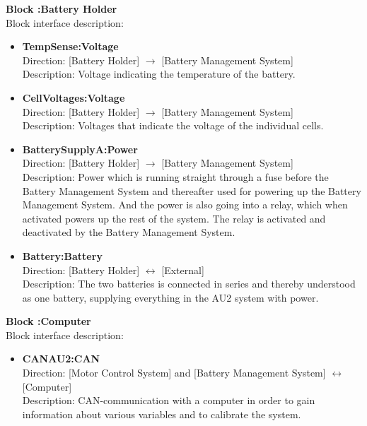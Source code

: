 \textbf{Block :Battery Holder}\\
Block interface description:
\begin{itemize}
	\item \textbf{TempSense:Voltage}\\
	Direction: [Battery Holder] $\rightarrow$ [Battery Management System]\\
	Description: Voltage indicating the temperature of the battery.
	\item \textbf{CellVoltages:Voltage}\\
	Direction: [Battery Holder] $\rightarrow$ [Battery Management System]\\
	Description: Voltages that indicate the voltage of the individual cells.
	\item \textbf{BatterySupplyA:Power}\\
	Direction: [Battery Holder] $\rightarrow$ [Battery Management System]\\
	Description: Power which is running straight through a fuse before the Battery Management System and thereafter used for powering up the Battery Management System. And the power is also going into a relay, which when activated powers up the rest of the system. The relay is activated and deactivated by the Battery Management System.
	\item \textbf{Battery:Battery}\\
	Direction: [Battery Holder] $\leftrightarrow$ [External]\\
	Description: The two batteries is connected in series and thereby understood as one battery, supplying everything in the AU2 system with power.
\end{itemize}

\textbf{Block :Computer}\\
Block interface description:
\begin{itemize}
	\item \textbf{CANAU2:CAN}\\
	Direction: [Motor Control System] and [Battery Management System] $\leftrightarrow$ [Computer]\\
	Description: CAN-communication with a computer in order to gain information about various variables and to calibrate the system.
\end{itemize}